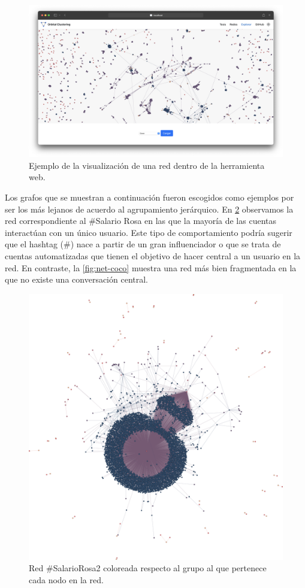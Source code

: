  \begin{figure}
   \centering
   \includegraphics[width=1\textwidth]{images/web-graph.png}
    \caption{Ejemplo de la visualización de una red dentro de la herramienta web.}
    \label{img:web-graph}
\end{figure}

Los grafos que se muestran a continuación fueron escogidos como ejemplos por ser los más lejanos de acuerdo al agrupamiento jerárquico. En \ref{fig:net-salario} observamos la red correspondiente al \#Salario Rosa en las que la mayoría de las cuentas interactúan con un único usuario. Este tipo de comportamiento podría sugerir que el hashtag (\#) nace a partir de un gran influenciador o que se trata de cuentas automatizadas que tienen el objetivo de hacer central a un usuario en la red. En contraste, la \ref{fig:net-coco} muestra una red más bien fragmentada en la que no existe una conversación central.

\begin{figure}
    \centering
    \includegraphics[width=.75\textwidth]{images/SalarioRosa.png}
    \caption{Red \#SalarioRosa2 coloreada respecto al grupo al que pertenece cada nodo en la red.}
    \label{fig:net-salario}
\end{figure}

